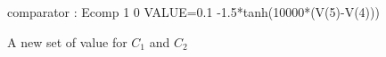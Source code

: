 \begin{figure}[!h]
comparator : Ecomp 1 0 VALUE={0.1 -1.5*tanh(10000*(V(5)-V(4)))}
\begin{center}
\end{center}
\end{figure}
\begin{figure}[!h]
A new set of value for $C_{1}$ and $C_{2}$
\begin{center}
\end{center}
\end{figure}

\newpage
